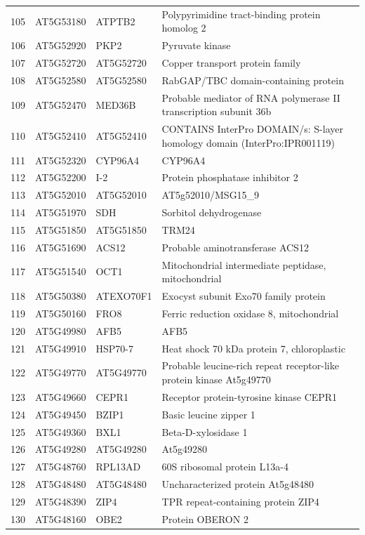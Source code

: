 \documentclass[11pt]{article}
\begin{document}
\begin{center}
\begin{tabular}{rlll}
105 & AT5G53180 & ATPTB2 & Polypyrimidine tract-binding protein homolog 2\\
106 & AT5G52920 & PKP2 & Pyruvate kinase\\
107 & AT5G52720 & AT5G52720 & Copper transport protein family\\
108 & AT5G52580 & AT5G52580 & RabGAP/TBC domain-containing protein\\
109 & AT5G52470 & MED36B & Probable mediator of RNA polymerase II transcription subunit 36b\\
110 & AT5G52410 & AT5G52410 & CONTAINS InterPro DOMAIN/s: S-layer homology domain (InterPro:IPR001119)\\
111 & AT5G52320 & CYP96A4 & CYP96A4\\
112 & AT5G52200 & I-2 & Protein phosphatase inhibitor 2\\
113 & AT5G52010 & AT5G52010 & AT5g52010/MSG15\_9\\
114 & AT5G51970 & SDH & Sorbitol dehydrogenase\\
115 & AT5G51850 & AT5G51850 & TRM24\\
116 & AT5G51690 & ACS12 & Probable aminotransferase ACS12\\
117 & AT5G51540 & OCT1 & Mitochondrial intermediate peptidase, mitochondrial\\
118 & AT5G50380 & ATEXO70F1 & Exocyst subunit Exo70 family protein\\
119 & AT5G50160 & FRO8 & Ferric reduction oxidase 8, mitochondrial\\
120 & AT5G49980 & AFB5 & AFB5\\
121 & AT5G49910 & HSP70-7 & Heat shock 70 kDa protein 7, chloroplastic\\
122 & AT5G49770 & AT5G49770 & Probable leucine-rich repeat receptor-like protein kinase At5g49770\\
123 & AT5G49660 & CEPR1 & Receptor protein-tyrosine kinase CEPR1\\
124 & AT5G49450 & BZIP1 & Basic leucine zipper 1\\
125 & AT5G49360 & BXL1 & Beta-D-xylosidase 1\\
126 & AT5G49280 & AT5G49280 & At5g49280\\
127 & AT5G48760 & RPL13AD & 60S ribosomal protein L13a-4\\
128 & AT5G48480 & AT5G48480 & Uncharacterized protein At5g48480\\
129 & AT5G48390 & ZIP4 & TPR repeat-containing protein ZIP4\\
130 & AT5G48160 & OBE2 & Protein OBERON 2\\

\end{tabular}
\end{center}
\end{document}
